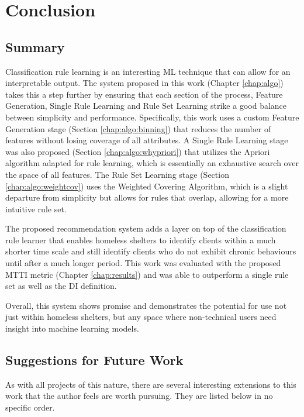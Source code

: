 \chapter{Conclusion} \label{chap:conclusion}

\section{Summary}

Classification rule learning is an interesting ML technique that can allow for an interpretable output. The system proposed in this work (Chapter \ref{chap:algo}) takes this a step further by ensuring that each section of the process, Feature Generation, Single Rule Learning and Rule Set Learning strike a good balance between simplicity and performance. Specifically, this work uses a custom Feature Generation stage (Section \ref{chap:algo:binning}) that reduces the number of features without losing coverage of all attributes. A Single Rule Learning stage was also proposed (Section \ref{chap:algo:whypriori}) that utilizes the Apriori algorithm adapted for rule learning, which is essentially an exhaustive search over the space of all features. The Rule Set Learning stage (Section \ref{chap:algo:weightcov}) uses the Weighted Covering Algorithm, which is a slight departure from simplicity but allows for rules that overlap, allowing for a more intuitive rule set. 

The proposed \Abb recommendation system adds a layer on top of the classification rule learner that enables homeless shelters to identify clients within a much shorter time scale and still identify clients who do not exhibit chronic behaviours until after a much longer period. This work was evaluated with the proposed MTTI metric (Chapter \ref{chap:results}) and was able to outperform a single rule set as well as the DI definition.


Overall, this system shows promise and demonstrates the potential for use not just within homeless shelters, but any space where non-technical users need insight into machine learning models.


\section{Suggestions for Future Work}

As with all projects of this nature, there are several interesting extensions to this work that the author feels are worth pursuing. They are listed below in no specific order.

